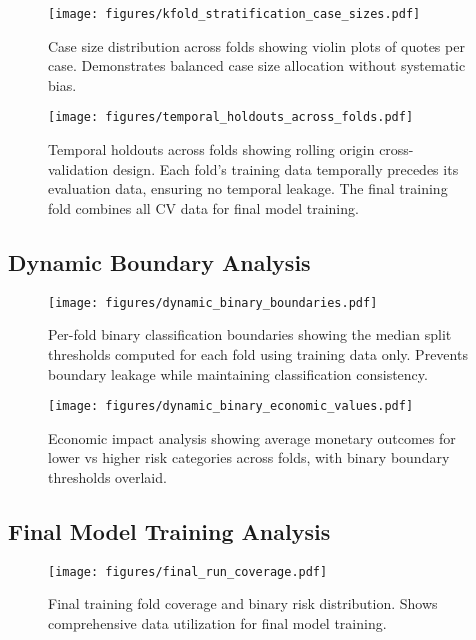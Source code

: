 \documentclass[11pt,a4paper]{article}
\begin{document}
\begin{figure}[H]
\centering
\texttt{[image: figures/kfold\_stratification\_case\_sizes.pdf]}
\caption{Case size distribution across folds showing violin plots of quotes per case. Demonstrates balanced case size allocation without systematic bias.}
\end{figure}

\begin{figure}[H]
\centering
\texttt{[image: figures/temporal\_holdouts\_across\_folds.pdf]}
\caption{Temporal holdouts across folds showing rolling origin cross-validation design. Each fold's training data temporally precedes its evaluation data, ensuring no temporal leakage. The final training fold combines all CV data for final model training.}
\end{figure}

\subsection{Dynamic Boundary Analysis}

\begin{figure}[H]
\centering
\texttt{[image: figures/dynamic\_binary\_boundaries.pdf]}
\caption{Per-fold binary classification boundaries showing the median split thresholds computed for each fold using training data only. Prevents boundary leakage while maintaining classification consistency.}
\end{figure}

\begin{figure}[H]
\centering
\texttt{[image: figures/dynamic\_binary\_economic\_values.pdf]}
\caption{Economic impact analysis showing average monetary outcomes for lower vs higher risk categories across folds, with binary boundary thresholds overlaid.}
\end{figure}

\subsection{Final Model Training Analysis}

\begin{figure}[H]
\centering
\texttt{[image: figures/final\_run\_coverage.pdf]}
\caption{Final training fold coverage and binary risk distribution. Shows comprehensive data utilization for final model training.}
\end{figure}
\end{document}
